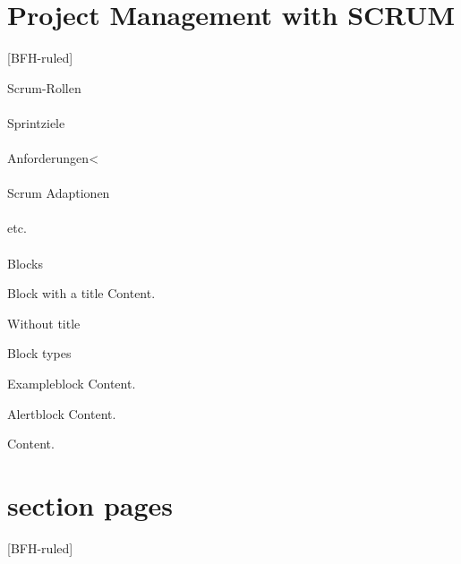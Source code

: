 \documentclass[
    ngerman,%
    authorontitle=true,
]{bfhbeamer}
\begin{document}
    \section{Project Management with SCRUM}
    [BFH-ruled]
    \frame{\sectionpage}

    \begin{frame}{Scrum-Rollen}
        \framesubtitle{}
    \end{frame}

    \begin{frame}{Sprintziele}
        \framesubtitle{}
    \end{frame}

    \begin{frame}{Anforderungen}<
        \framesubtitle{}
    \end{frame}

    \begin{frame}{Scrum Adaptionen}
        \framesubtitle{}
    \end{frame}

    \begin{frame}{etc.}
        \framesubtitle{}
    \end{frame}

    \begin{frame}{Blocks}
        \begin{block}{Block with a title}
            Content.
        \end{block}
        \begin{block}{}
            Without title
        \end{block}
    \end{frame}

    \begin{frame}{Block types}
        \begin{exampleblock}{Exampleblock}
            Content.
        \end{exampleblock}
        \begin{alertblock}{Alertblock}
            Content.
        \end{alertblock}
        \begin{example}
            Content.
        \end{example}
    \end{frame}

    \section{section pages}

    [BFH-ruled]
    \frame{\sectionpage}





\end{document}
